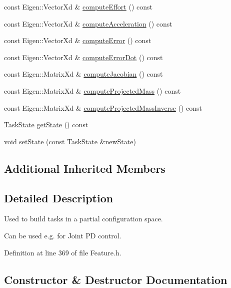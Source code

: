 \begin{DoxyCompactItemize}
const Eigen\+::\+Vector\+Xd \& \hyperlink{classocra_1_1PartialStateFeature_abc447a46a7bb1b4480af965119d23214}{compute\+Effort} () const
\item 
const Eigen\+::\+Vector\+Xd \& \hyperlink{classocra_1_1PartialStateFeature_a7ed5a87165deed25a91f073e348c53a3}{compute\+Acceleration} () const
\item 
const Eigen\+::\+Vector\+Xd \& \hyperlink{classocra_1_1PartialStateFeature_a7d412f45a1ae3ce72a82cee84cdddc7e}{compute\+Error} () const
\item 
const Eigen\+::\+Vector\+Xd \& \hyperlink{classocra_1_1PartialStateFeature_a946499ed311c24cb0cd9953b51b7d170}{compute\+Error\+Dot} () const
\item 
const Eigen\+::\+Matrix\+Xd \& \hyperlink{classocra_1_1PartialStateFeature_a134ada6399c8f4bda311844c79cd5467}{compute\+Jacobian} () const
\item 
const Eigen\+::\+Matrix\+Xd \& \hyperlink{classocra_1_1PartialStateFeature_a984c0fd5400ff69faaab55d81cf8320b}{compute\+Projected\+Mass} () const
\item 
const Eigen\+::\+Matrix\+Xd \& \hyperlink{classocra_1_1PartialStateFeature_a1e1a569e8472551e91845e585c30c4ca}{compute\+Projected\+Mass\+Inverse} () const
\item 
\hyperlink{classocra_1_1TaskState}{Task\+State} \hyperlink{classocra_1_1PartialStateFeature_abb71a3727198affb3d250e6942fb6eee}{get\+State} () const
\item 
void \hyperlink{classocra_1_1PartialStateFeature_a89e830a1d3bea028431c4ae0844a6d95}{set\+State} (const \hyperlink{classocra_1_1TaskState}{Task\+State} \&new\+State)
\end{DoxyCompactItemize}
\subsection*{Additional Inherited Members}


\subsection{Detailed Description}
Used to build tasks in a partial configuration space. 

Can be used e.\+g. for Joint PD control. 

Definition at line 369 of file Feature.\+h.



\subsection{Constructor \& Destructor Documentation}
\hypertarget{classocra_1_1PartialStateFeature_a07a8b02519ae7a77580f8e2deefc86dd}{}\label{classocra_1_1PartialStateFeature_a07a8b02519ae7a77580f8e2deefc86dd} 
